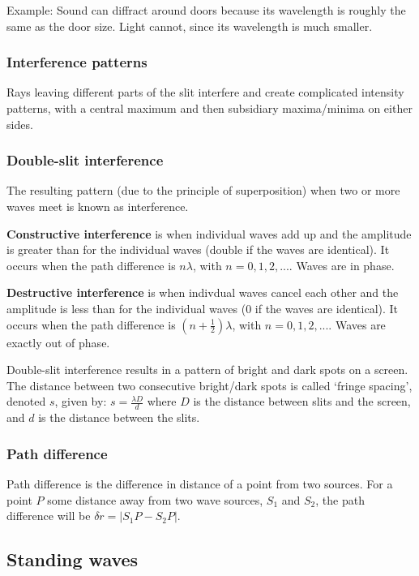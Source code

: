 Example: Sound can diffract around doors because its wavelength is roughly the
same as the door size. Light cannot, since its wavelength is much smaller.

\subsubsection{Interference patterns}
Rays leaving different parts of the slit interfere and create complicated
intensity patterns, with a central maximum and then subsidiary maxima/minima
on either sides.

\subsubsection{Double-slit interference}
The resulting pattern (due to the principle of superposition) when two or more
waves meet is known as interference.

\textbf{Constructive interference} is when individual waves add up and the
amplitude is greater than for the individual waves (double if the waves are
identical). It occurs when the path difference is $n\lambda$, with
$n = 0, 1, 2, ...$. Waves are in phase.

\textbf{Destructive interference} is when indivdual waves cancel each other and
the amplitude is less than for the individual waves (0 if the waves are
identical). It occurs when the path difference is $(n + \frac{1}{2})\lambda$,
with $n = 0, 1, 2, ...$. Waves are exactly out of phase.

Double-slit interference results in a pattern of bright and dark spots on a
screen. The distance between two consecutive bright/dark spots is called
`fringe spacing', denoted $s$, given by: $s = \frac{\lambda D}{d}$ where $D$ is
the distance between slits and the screen, and $d$ is the distance between the
slits.

\subsubsection{Path difference}
Path difference is the difference in distance of a point from two sources. For
a point $P$ some distance away from two wave sources, $S_1$ and $S_2$, the
path difference will be $\delta r = |S_1P - S_2P |$.

\subsection{Standing waves}

